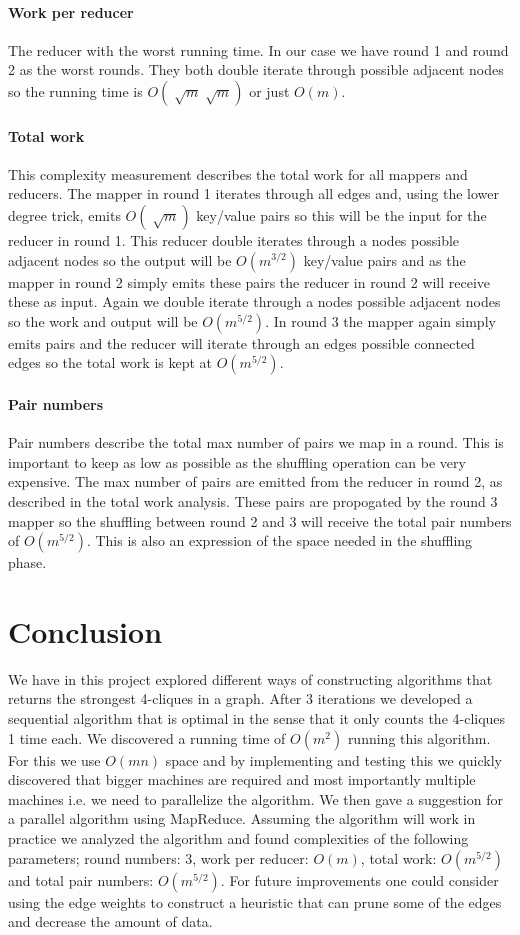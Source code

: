 \documentclass{article}
\begin{document}
\paragraph{Work per reducer}
The reducer with the worst running time. In our case we have round 1 and round 2 as the worst rounds. They both double iterate through possible adjacent nodes so the running time is $O(\sqrt[]{m}\sqrt[]{m})$ or just $O(m)$.

\paragraph{Total work}
This complexity measurement describes the total work for all mappers and reducers. The mapper in round 1 iterates through all edges and, using the lower degree trick, emits $O(\sqrt[]{m})$ key/value pairs so this will be the input for the reducer in round 1. This reducer double iterates through a nodes possible adjacent nodes so the output will be $O(m^{3/2})$ key/value pairs and as the mapper in round 2 simply emits these pairs the reducer in round 2 will receive these as input. Again we double iterate through a nodes possible adjacent nodes so the work and output will be $O(m^{5/2})$. In round 3 the mapper again simply emits pairs and the reducer will iterate through an edges possible connected edges so the total work is kept at $O(m^{5/2})$.

\paragraph{Pair numbers}
Pair numbers describe the total max number of pairs we map in a round. This is important to keep as low as possible as the shuffling operation can be very expensive. The max number of pairs are emitted from the reducer in round 2, as described in the total work analysis. These pairs are propogated by the round 3 mapper so the shuffling between round 2 and 3 will receive the total pair numbers of $O(m^{5/2})$. This is also an expression of the space needed in the shuffling phase.

\section{Conclusion}
We have in this project explored different ways of constructing algorithms that returns the strongest 4-cliques in a graph. After 3 iterations we developed a sequential algorithm that is optimal in the sense that it only counts the 4-cliques 1 time each. We discovered a running time of $O(m^{2})$ running this algorithm. For this we use $O(mn)$ space and by implementing and testing this we quickly discovered that bigger machines are required and most importantly multiple machines i.e. we need to parallelize the algorithm.
We then gave a suggestion for a parallel algorithm using MapReduce. Assuming the algorithm will work in practice we analyzed the algorithm and found complexities of the following parameters; round numbers: 3, work per reducer: $O(m)$, total work: $O(m^{5/2})$ and total pair numbers: $O(m^{5/2})$.
For future improvements one could consider using the edge weights to construct a heuristic that can prune some of the edges and decrease the amount of data.
\end{document}
